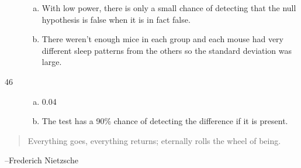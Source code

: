 \documentclass[letterpaper, landscape]{exam}
\begin{document}
\begin{description}
\begin{enumerate}[(a)]
          \item With low power, there is only a small chance of detecting that
            the null hypothesis is false when it is in fact false.

          \item There weren't enough mice in each group and each mouse had very
            different sleep patterns from the others so the standard deviation
            was large.

        \end{enumerate}

      \item[46]
        \begin{enumerate}[(a)]
          \item 0.04

          \item The test has a 90\% chance of detecting the difference if it is
            present.
        \end{enumerate}

  \end{description}

  \else
    \vspace{12 cm}
    \begin{quote}
      \begin{em}
        Everything goes, everything returns; eternally rolls the wheel of
        being.
      \end{em}
    \end{quote}
    \hspace{1 cm}--Frederich Nietzsche
  \fi
\end{document}
